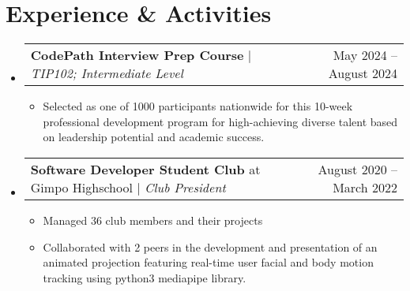 \documentclass[letterpaper,11pt]{article}
\makeatletter
\newcommand{\resumeItem}[1]{
  \item\small{
    {#1 \vspace{-2pt}}
  }
}
\newcommand{\resumeProjectHeading}[2]{
    \item
    \begin{tabular*}{0.97\textwidth}{l@{\extracolsep{\fill}}r@{\hspace{-0.2in}}}
        \small#1 & #2 \\
    \end{tabular*}\vspace{-7pt}
}
\newcommand{\resumeSubHeadingListStart}{\begin{itemize}[leftmargin=0.00in, rightmargin=-0.2in, label={}]}
\newcommand{\resumeSubHeadingListEnd}{\end{itemize}}
\newcommand{\resumeItemListStart}{\begin{itemize}[leftmargin=0.15in]}
\newcommand{\resumeItemListEnd}{\end{itemize}\vspace{-5pt}}
\makeatother
\begin{document}

\section{Experience \& Activities}
    \resumeSubHeadingListStart
        \resumeProjectHeading
            {\textbf{CodePath Interview Prep Course} $|$ \emph{TIP102; Intermediate Level}}{May 2024 -- August 2024}
            \resumeItemListStart
                \resumeItem{Selected as one of 1000 participants nationwide for this 10-week professional development program for high-achieving diverse talent based on leadership potential and academic success.}
            \resumeItemListEnd
        \resumeSubHeadingListEnd
    \resumeSubHeadingListStart
        \resumeProjectHeading
            {\textbf{Software Developer Student Club} at Gimpo Highschool $|$ \emph{Club President}}{August 2020 -- March 2022}
            \resumeItemListStart
                \resumeItem{Managed 36 club members and their projects}
                \resumeItem{Collaborated with 2 peers in the development and presentation of an animated projection featuring real-time user facial and body motion tracking using python3 mediapipe library.}
            \resumeItemListEnd
        \resumeSubHeadingListEnd
\end{document}

